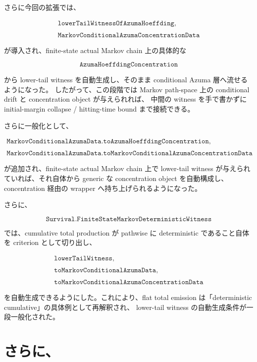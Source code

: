 \documentclass[12pt,a4paper]{article}
\begin{document}
さらに今回の拡張では、

\[
\begin{aligned}
\texttt{lowerTailWitnessOfAzumaHoeffding}, \\
\qquad \\
\texttt{MarkovConditionalAzumaConcentrationData}
\end{aligned}
\]

が導入され、finite-state actual Markov chain 上の具体的な

\[
\texttt{AzumaHoeffdingConcentration}
\]

から lower-tail witness を自動生成し、そのまま conditional Azuma 層へ流せるようになった。 したがって、この段階では Markov path-space 上の conditional drift と concentration object が与えられれば、 中間の witness を手で書かずに initial-margin collapse / hitting-time bound まで接続できる。

さらに一般化として、

\[
\begin{aligned}
\texttt{MarkovConditionalAzumaData.toAzumaHoeffdingConcentration}, \\
\qquad \\
\texttt{MarkovConditionalAzumaData.toMarkovConditionalAzumaConcentrationData}
\end{aligned}
\]

が追加され、finite-state actual Markov chain 上で lower-tail witness が与えられていれば、それ自体から generic な concentration object を自動構成し、concentration 経由の wrapper へ持ち上げられるようになった。

さらに、

\[
\texttt{Survival.FiniteStateMarkovDeterministicWitness}
\]

では、cumulative total production が pathwise に deterministic であること自体を criterion として切り出し、

\[
\begin{aligned}
\texttt{lowerTailWitness}, \\
\qquad \\
\texttt{toMarkovConditionalAzumaData}, \\
\qquad \\
\texttt{toMarkovConditionalAzumaConcentrationData}
\end{aligned}
\]

を自動生成できるようにした。これにより、flat total emission は「deterministic cumulative」の具体例として再解釈され、 lower-tail witness の自動生成条件が一段一般化された。

\section{さらに、}\label{ux3055ux3089ux306b-3}
\end{document}
